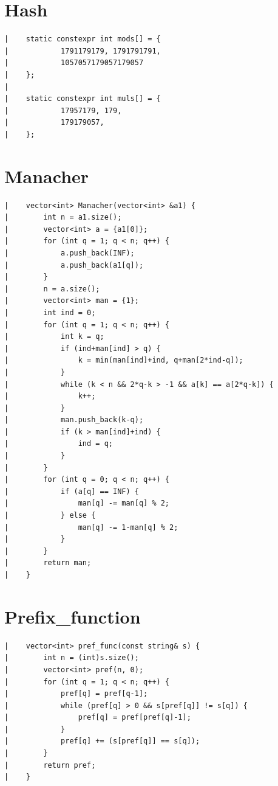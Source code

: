 \documentclass[a4paper, 10pt]{article}
\begin{document}
\begin{center}
\section*{Hash}
\begin{verbatim}
|    static constexpr int mods[] = {
|            1791179179, 1791791791,
|            1057057179057179057
|    };
|    
|    static constexpr int muls[] = {
|            17957179, 179,
|            179179057,
|    };
\end{verbatim}

\section*{Manacher}
\begin{verbatim}
|    vector<int> Manacher(vector<int> &a1) {
|        int n = a1.size();
|        vector<int> a = {a1[0]};
|        for (int q = 1; q < n; q++) {
|            a.push_back(INF);
|            a.push_back(a1[q]);
|        }
|        n = a.size();
|        vector<int> man = {1};
|        int ind = 0;
|        for (int q = 1; q < n; q++) {
|            int k = q;
|            if (ind+man[ind] > q) {
|                k = min(man[ind]+ind, q+man[2*ind-q]);
|            }
|            while (k < n && 2*q-k > -1 && a[k] == a[2*q-k]) {
|                k++;
|            }
|            man.push_back(k-q);
|            if (k > man[ind]+ind) {
|                ind = q;
|            }
|        }
|        for (int q = 0; q < n; q++) {
|            if (a[q] == INF) {
|                man[q] -= man[q] % 2;
|            } else {
|                man[q] -= 1-man[q] % 2;
|            }
|        }
|        return man;
|    }
\end{verbatim}

\section*{Prefix\_function}
\begin{verbatim}
|    vector<int> pref_func(const string& s) {
|        int n = (int)s.size();
|        vector<int> pref(n, 0);
|        for (int q = 1; q < n; q++) {
|            pref[q] = pref[q-1];
|            while (pref[q] > 0 && s[pref[q]] != s[q]) {
|                pref[q] = pref[pref[q]-1];
|            }
|            pref[q] += (s[pref[q]] == s[q]);
|        }
|        return pref;
|    }
\end{verbatim}


\end{center}
\end{document}

